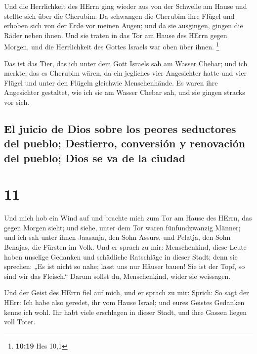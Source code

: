 Und die Herrlichkeit des HErrn ging wieder aus von der
Schwelle am Hause und stellte sich über die Cherubim.  Da
schwangen die Cherubim ihre Flügel und erhoben sich von der Erde vor
meinen Augen; und da sie ausgingen, gingen die Räder neben ihnen. Und
sie traten in das Tor am Hause des HErrn gegen Morgen, und die
Herrlichkeit des Gottes Israels war oben über ihnen. \footnote{\textbf{10:19}
  Hes 10,1}

 Das ist das Tier, das ich unter dem Gott Israels sah am
Wasser Chebar; und ich merkte, das es Cherubim wären,  da
ein jegliches vier Angesichter hatte und vier Flügel und unter den
Flügeln gleichwie Menschenhände.  Es waren ihre
Angesichter gestaltet, wie ich sie am Wasser Chebar sah, und sie gingen
stracks vor sich.

\hypertarget{el-juicio-de-dios-sobre-los-peores-seductores-del-pueblo-destierro-conversiuxf3n-y-renovaciuxf3n-del-pueblo-dios-se-va-de-la-ciudad}{%
\subsection{El juicio de Dios sobre los peores seductores del pueblo;
Destierro, conversión y renovación del pueblo; Dios se va de la
ciudad}\label{el-juicio-de-dios-sobre-los-peores-seductores-del-pueblo-destierro-conversiuxf3n-y-renovaciuxf3n-del-pueblo-dios-se-va-de-la-ciudad}}

\hypertarget{section-10}{%
\section{11}\label{section-10}}

 Und mich hob ein Wind auf und brachte mich zum Tor am
Hause des HErrn, das gegen Morgen sieht; und siehe, unter dem Tor waren
fünfundzwanzig Männer; und ich sah unter ihnen Jaasanja, den Sohn
Assurs, und Pelatja, den Sohn Benajas, die Fürsten im Volk.
 Und er sprach zu mir: Menschenkind, diese Leute haben
unselige Gedanken und schädliche Ratschläge in dieser Stadt;
 denn sie sprechen: „Es ist nicht so nahe; lasst uns nur
Häuser bauen! Sie ist der Topf, so sind wir das Fleisch.``
 Darum sollst du, Menschenkind, wider sie weissagen.

 Und der Geist des HErrn fiel auf mich, und er sprach zu
mir: Sprich: So sagt der HErr: Ich habe also geredet, ihr vom Hause
Israel; und eures Geistes Gedanken kenne ich wohl.  Ihr
habt viele erschlagen in dieser Stadt, und ihre Gassen liegen voll
Toter.

